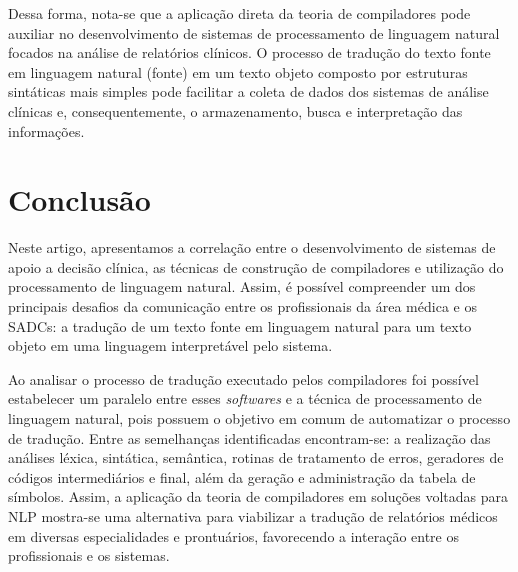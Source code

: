 \documentclass[12pt]{article}
\begin{document}
Dessa forma, nota-se que a aplicação direta da teoria de compiladores pode auxiliar no desenvolvimento de sistemas de processamento de linguagem natural focados na análise de relatórios clínicos. O processo de tradução do texto fonte em linguagem natural (fonte) em um texto objeto composto por estruturas sintáticas mais simples pode facilitar a coleta de dados dos sistemas de análise clínicas e, consequentemente, o armazenamento, busca e interpretação das informações. 


\section{Conclusão}

Neste artigo, apresentamos a correlação entre o desenvolvimento de sistemas de apoio a decisão clínica, as técnicas de construção de compiladores e utilização do processamento de linguagem natural. Assim, é possível compreender um dos principais desafios da comunicação entre os profissionais da área médica e os SADCs: a tradução de um texto fonte em linguagem natural para um texto objeto em uma linguagem interpretável pelo sistema.

Ao analisar o processo de tradução executado pelos compiladores foi possível estabelecer um paralelo entre esses \textit{softwares} e a técnica de processamento de linguagem natural, pois possuem o objetivo em comum de automatizar o processo de tradução. Entre as semelhanças identificadas encontram-se: a realização das análises léxica, sintática, semântica, rotinas de tratamento de erros, geradores de códigos intermediários e final, além da geração e administração da tabela de símbolos.
Assim, a aplicação da teoria de compiladores em soluções voltadas para NLP mostra-se uma alternativa para viabilizar a tradução de relatórios médicos em diversas especialidades e prontuários, favorecendo a interação entre os profissionais e os sistemas.




\end{document}
